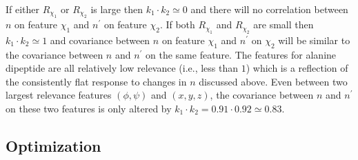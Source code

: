 If either $R_{\chi_1}$ or $R_{\chi_2}$ is large then $k_1 \cdot k_2 \simeq 0$ and there will no correlation between $n$ on feature $\chi_1$ and $n^{\prime}$ on feature $\chi_2$. If both $R_{\chi_1}$ and $R_{\chi_2}$ are small then $k_1 \cdot k_2 \simeq 1$ and covariance between $n$ on feature $\chi_1$ and $n^{\prime}$ on $\chi_2$ will be similar to the covariance between $n$ and $n^{\prime}$ on the same feature.  The features for alanine dipeptide are all relatively low relevance (i.e., less than $1$) which is a reflection of the  consistently flat response to changes in $n$ discussed above. Even between  two largest relevance features $(\phi, \psi)$ and $(x,y,z)$, the covariance between $n$ and $n^{\prime}$ on these two features is only altered by  $k_{1}\cdot k_{2} = 0.91\cdot0.92 \simeq 0.83$. 

\subsection{Optimization}\label{sec:ala_opt}

